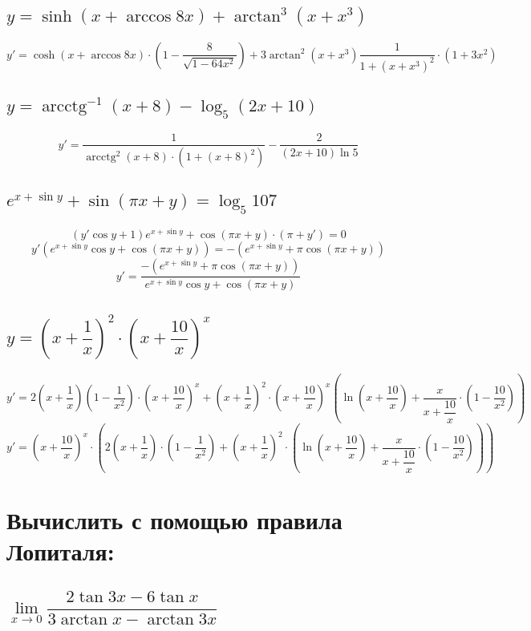 \documentclass[12pt]{article}
\DeclareMathOperator{\arcctg}{arcctg}
\begin{document}
\begin{sloppypar}
    \subsection{$y = \sinh(x + \arccos{8x}) + \arctan^3(x + x^3)$}
    \[
        y' = \cosh(x + \arccos{8x}) \cdot (1 - \dfrac{8}{\sqrt{1 - 64x^2}}) + 3\arctan^2{(x + x^3)} \dfrac{1}{1 + (x + x^3)^2} \cdot (1 + 3x^2)
    \]

    \subsection{$y = \arcctg^{-1}{(x + 8)} - \log_5{(2x + 10)}$}
    \[
        y' = \dfrac{1}{\arcctg^2{(x + 8)} \cdot (1 + (x + 8)^2)} - \dfrac{2}{(2x + 10)\ln{5}}
    \]

    \subsection{$e^{x + \sin y} + \sin(\pi x + y) = \log_5 107$}
    \[
        (y' \cos y + 1) e^{x + \sin y} + \cos(\pi x + y) \cdot (\pi + y') = 0
    \]
    \[
        y'(e^{x + \sin y}\cos y + \cos(\pi x + y)) = -(e^{x + \sin y} + \pi \cos(\pi x + y))
    \]
    \[
        y' = \dfrac{-(e^{x + \sin y} + \pi \cos(\pi x + y))}{e^{x + \sin y}\cos y + \cos(\pi x + y)}
    \]

    \subsection{$y = \left(x + \dfrac{1}{x}\right)^2 \cdot \left(x + \dfrac{10}{x}\right)^x$}
    \[
        y' = 2 \left(x + \dfrac{1}{x}\right) \left(1 - \dfrac{1}{x^2}\right) \cdot \left (x + \dfrac{10}{x}\right)^x + \left( x + \dfrac{1}{x} \right)^2 \cdot \left (x + \dfrac{10}{x}\right)^x \left( \ln{\left(x + \dfrac{10}{x}\right)} + \dfrac{x}{x + \dfrac{10}{x}} \cdot \left(1 - \dfrac{10}{x^2}\right) \right)
    \]
    \[
        y' = \left (x + \dfrac{10}{x}\right)^x \cdot \left(2 \left(x + \dfrac{1}{x} \right) \cdot \left(1 - \dfrac{1}{x^2}\right) + \left(x + \dfrac{1}{x} \right)^2 \cdot \left( \ln{\left(x + \dfrac{10}{x}\right)} + \dfrac{x}{x + \dfrac{10}{x}} \cdot \left(1 - \dfrac{10}{x^2}\right) \right) \right)
    \]

    \section{Вычислить с помощью правила Лопиталя:}
    \subsection{$\lim\limits_{x \rightarrow 0} {\dfrac{2 \tan {3x} - 6\tan{x}}{3 \arctan x - \arctan {3x} }}$}

\end{sloppypar}
\end{document}
